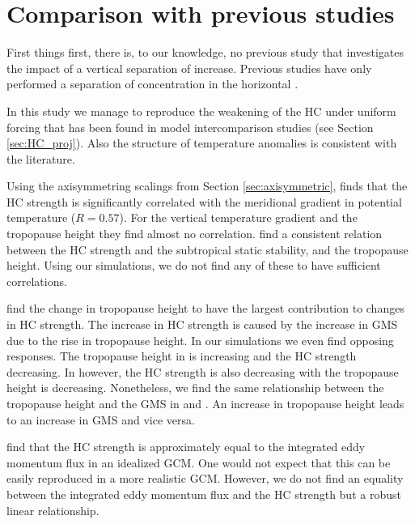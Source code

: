 \section{Comparison with previous studies}

First things first, there is, to our knowledge, no previous study that investigates the impact of a vertical separation of \CO increase. Previous studies have only performed a separation of \CO concentration in the horizontal \parencite{kimWeakHadleyCell2022}.

In this study we manage to reproduce the weakening of the HC under uniform \CO forcing that has been found in model intercomparison studies (see Section \ref{sec:HC_proj}). Also the structure of temperature anomalies is consistent with the literature.

Using the axisymmetring scalings from Section \ref{sec:axisymmetric}, \textcite{seoMechanismFutureChanges2014} finds that the HC strength is significantly correlated with the meridional gradient in potential temperature ($R=0.57$). For the vertical temperature gradient and the tropopause height they find almost no correlation. \textcite{dagostinoFactorsControllingHadley2017} find a consistent relation between the HC strength and the subtropical static stability, and the tropopause height. Using our simulations, we do not find any of these to have sufficient correlations.

\textcite{fanWeakeningTropicalCirculation2024} find the change in tropopause height to have the largest contribution to changes in HC strength. The increase in HC strength is caused by the increase in GMS due to the rise in tropopause height. In our simulations we even find opposing responses. The tropopause height in \uniform is increasing and the HC strength decreasing. In \strato however, the HC strength is also decreasing with the tropopause height is decreasing. Nonetheless, we find the same relationship between the tropopause height and the GMS in \uniform and \tropo. An increase in tropopause height leads to an increase in GMS and vice versa.
 
\textcite{walkerEddyInfluencesHadley2006} find that the HC strength is approximately equal to the integrated eddy momentum flux in an idealized GCM. One would not expect that this can be easily reproduced in a more realistic GCM. However, we do not find an equality between the integrated eddy momentum flux and the HC strength but a robust linear relationship. 


